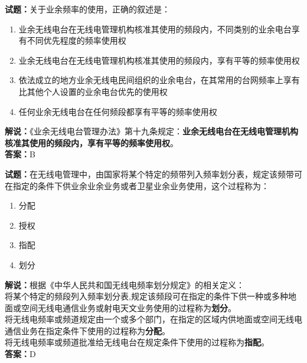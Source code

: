 \documentclass{ctexbook}
\begin{document}
\bigskip




\noindent\textbf{试题：}关于业余频率的使用，正确的叙述是：
\begin{enumerate}[leftmargin=3em]
\item 业余无线电台在无线电管理机构核准其使用的频段内，不同类别的业余电台享有不同优先程度的频率使用权
\item 业余无线电台在无线电管理机构核准其使用的频段内，享有平等的频率使用权
\item 依法成立的地方业余无线电民间组织的业余电台，在其常用的台网频率上享有比其他个人设置的业余电台优先的使用权
\item 任何业余无线电台在任何频段都享有平等的频率使用权
\end{enumerate}
\noindent\textbf{解说：}《业余无线电台管理办法》第十九条规定：\textbf{业余无线电台在无线电管理机构核准其使用的频段内，享有平等的频率使用权}。\\\noindent\textbf{答案：}B


\bigskip




\noindent\textbf{试题：}在无线电管理中，由国家将某个特定的频带列入频率划分表，规定该频带可在指定的条件下供业余业余业务或者卫星业余业务使用，这个过程称为：
\begin{enumerate}[leftmargin=3em]
\item 分配
\item 授权
\item 指配
\item 划分
\end{enumerate}
\noindent\textbf{解说：}根据《中华人民共和国无线电频率划分规定》的相关定义：\\将某个特定的频段列入频率划分表,规定该频段可在指定的条件下供一种或多种地面或空间无线电通信业务或射电天文业务使用的过程称为\textbf{划分}。\\将无线电频率或频道规定由一个或多个部门，在指定的区域内供地面或空间无线电通信业务在指定条件下使用的过程称为\textbf{分配}。\\将无线电频率或频道批准给无线电台在规定条件下使用的过程称为\textbf{指配}。\\
\textbf{答案：}D

\bigskip
\end{document}
